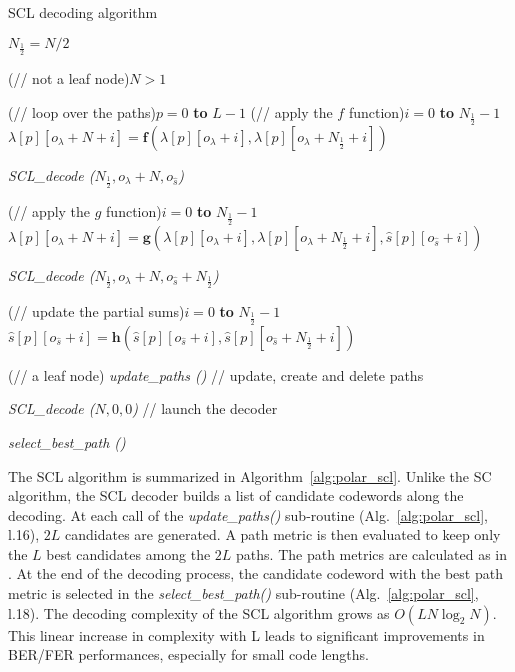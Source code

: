 \begin{algorithm}
  \caption{SCL decoding algorithm}\label{alg:polar_scl}



  {
    $N_{\frac{1}{2}} = N / 2$

    \uIf(// not a leaf node){$N > 1$}
    {
      \For(// loop over the paths){$p=0$ \textbf{to} $L-1$}
      {
        \For(// apply the $f$ function){$i=0$ \textbf{to} $N_{\frac{1}{2}}-1$}
        {
          $\lambda[p][o_\lambda + N + i] = \bm{f}(\lambda[p][o_\lambda + i], \lambda[p][o_\lambda + N_{\frac{1}{2}} + i])$
        }
      }

      \textit{SCL\_decode ($N_{\frac{1}{2}}, o_{\lambda} + N, o_{\hat{s}}$)}

      {
        \For(// apply the $g$ function){$i=0$ \textbf{to} $N_{\frac{1}{2}}-1$}
        {
          $\lambda[p][o_\lambda + N + i] = \bm{g}(\lambda[p][o_\lambda + i], \lambda[p][o_\lambda + N_{\frac{1}{2}} + i], \hat{s}[p][o_{\hat{s}} + i])$
        }
      }

      \textit{SCL\_decode ($N_{\frac{1}{2}}, o_{\lambda} + N, o_{\hat{s}} + N_{\frac{1}{2}}$)}

      {
        \For(// update the partial sums){$i=0$ \textbf{to} $N_{\frac{1}{2}}-1$}
        {
          $\hat{s}[p][o_{\hat{s}} + i] = \bm{h}(\hat{s}[p][o_{\hat{s}} + i], \hat{s}[p][o_{\hat{s}} + N_{\frac{1}{2}} + i])$
        }
      }
    }
    \Else(// a leaf node)
    {
      \textit{update\_paths ()} // update, create and delete paths
    }
  }

  \textit{SCL\_decode ($N, 0, 0$)} // launch the decoder

  \textit{select\_best\_path ()}
\end{algorithm}

The SCL algorithm is summarized in Algorithm~\ref{alg:polar_scl}. Unlike the SC
algorithm, the SCL decoder builds a list of candidate codewords along the
decoding. At each call of the \textit{update\_paths()} sub-routine
(Alg.~\ref{alg:polar_scl}, l.16), $2L$ candidates are generated. A path metric
is then evaluated to keep only the $L$ best candidates among the $2L$ paths. The
path metrics are calculated as in \cite{Balatsoukas-Stimming2015}. At the end of
the decoding process, the candidate codeword with the best path metric is
selected in the \textit{select\_best\_path()} sub-routine
(Alg.~\ref{alg:polar_scl}, l.18). The decoding complexity of the SCL algorithm
grows as $O(LN\log_2N)$. This linear increase in complexity with L leads to
significant improvements in BER/FER performances, especially for small code
lengths.


